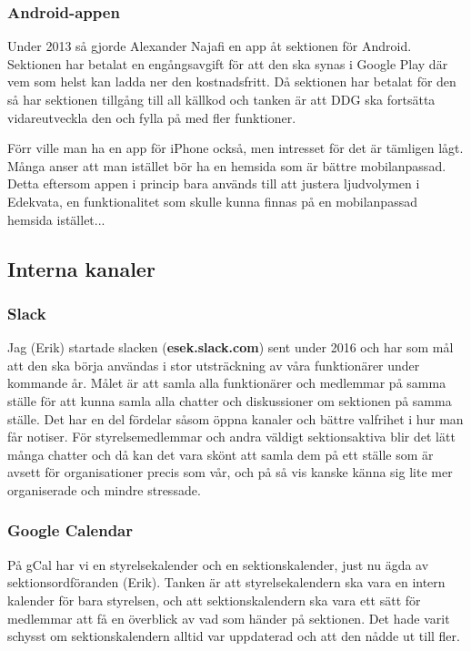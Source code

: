 \documentclass[10pt]{article}
\begin{document}
\subsubsection{Android-appen}
Under 2013 så gjorde Alexander Najafi en app åt sektionen för Android. Sektionen har betalat en engångsavgift för att den ska synas i Google Play där vem som helst kan ladda ner den kostnadsfritt. Då sektionen har betalat för den så har sektionen tillgång till all källkod och tanken är att DDG ska fortsätta vidareutveckla den och fylla på med fler funktioner.

Förr ville man ha en app för iPhone också, men intresset för det är tämligen lågt. Många anser att man istället bör ha en hemsida som är bättre mobilanpassad. Detta eftersom appen i princip bara används till att justera ljudvolymen i Edekvata, en funktionalitet som skulle kunna finnas på en mobilanpassad hemsida istället...

\subsection{Interna kanaler}
\subsubsection{Slack}
Jag (Erik) startade slacken (\textbf{esek.slack.com}) sent under 2016 och har som mål att den ska börja användas i stor utsträckning av våra funktionärer under kommande år. Målet är att samla alla funktionärer och medlemmar på samma ställe för att kunna samla alla chatter och diskussioner om sektionen på samma ställe. Det har en del fördelar såsom öppna kanaler och bättre valfrihet i hur man får notiser. För styrelsemedlemmar och andra väldigt sektionsaktiva blir det lätt många chatter och då kan det vara skönt att samla dem på ett ställe som är avsett för organisationer precis som vår, och på så vis kanske känna sig lite mer organiserade och mindre stressade.

\subsubsection{Google Calendar}
På gCal har vi en styrelsekalender och en sektionskalender, just nu ägda av sektionsordföranden (Erik). Tanken är att styrelsekalendern ska vara en intern kalender för bara styrelsen, och att sektionskalendern ska vara ett sätt för medlemmar att få en överblick av vad som händer på sektionen. Det hade varit schysst om sektionskalendern alltid var uppdaterad och att den nådde ut till fler.
\end{document}
